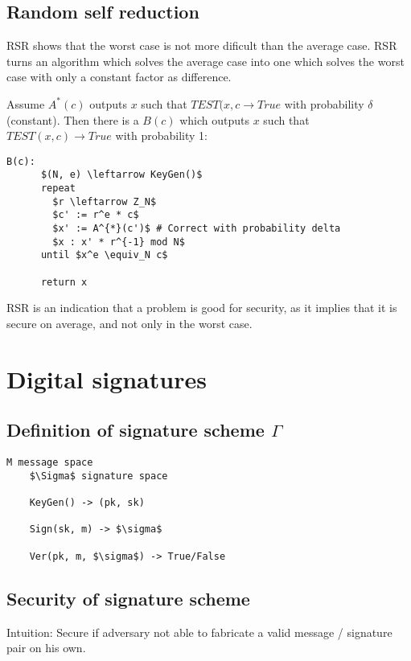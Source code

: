 \documentclass[a4paper]{scrreprt}
\begin{document}
\section{Random self reduction}

RSR shows that the worst case is not more dificult than the average case. RSR
turns an algorithm which solves the average case into one which solves the
worst case with only a constant factor as difference.

Assume $A^{*}(c)$ outputs $x$ such that $TEST(x, c \rightarrow True$ with
probability $\delta$ (constant). Then there is a $B(c)$ which outputs $x$ such
that $TEST(x, c) \rightarrow True$ with probability 1:

\begin{lstlisting}[mathescape=true,autogobble=true]
	B(c):
	  $(N, e) \leftarrow KeyGen()$
	  repeat
	    $r \leftarrow Z_N$
	    $c' := r^e * c$
	    $x' := A^{*}(c')$ # Correct with probability delta
	    $x : x' * r^{-1} mod N$
	  until $x^e \equiv_N c$

	  return x
\end{lstlisting}

RSR is an indication that a problem is good for security, as it implies that it
is secure on average, and not only in the worst case.

\chapter{Digital signatures}

\section{Definition of signature scheme $\Gamma$}

\begin{lstlisting}[mathescape=true,autogobble=true]
	M message space
	$\Sigma$ signature space

	KeyGen() -> (pk, sk)

	Sign(sk, m) -> $\sigma$

	Ver(pk, m, $\sigma$) -> True/False
\end{lstlisting}

\section{Security of signature scheme}

Intuition: Secure if adversary not able to fabricate a valid message /
signature pair on his own.
\end{document}
